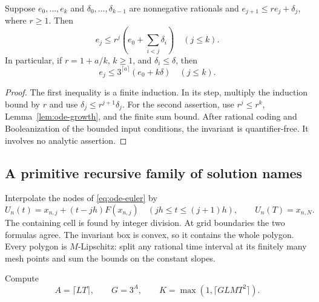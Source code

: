 \begin{lemma}
\label{lem:ode-gronwall}
Suppose $e_0,\ldots,e_k$ and $\delta_0,\ldots,\delta_{k-1}$ are
nonnegative rationals and
$e_{j+1}\le r e_j+\delta_j$, where $r\ge1$.  Then
\[
 e_j\le r^j\left(e_0+\sum_{i<j}\delta_i\right)\quad(j\le k).
\]
In particular, if $r=1+a/k$, $k\ge1$, and $\delta_i\le\delta$, then
\begin{equation}
 e_j\le3^{\lceil a\rceil}(e_0+k\delta)\quad(j\le k).
 \label{eq:ode-gronwall}
\end{equation}
\end{lemma}
\begin{proof}
The first inequality is a finite induction.  In its step, multiply the
induction bound by $r$ and use
$\delta_j\le r^{j+1}\delta_j$.  For the second assertion, use
$r^j\le r^k$, Lemma~\ref{lem:ode-growth}, and the finite sum bound.
After rational coding and Booleanization of the bounded input conditions,
the invariant is quantifier-free.  It involves no analytic assertion.
\end{proof}

\subsection{A primitive recursive family of solution names}

Interpolate the nodes of \eqref{eq:ode-euler} by
\begin{equation}
 U_n(t)=x_{n,j}+(t-jh)F(x_{n,j})
 \quad(jh\le t\le(j+1)h),\qquad U_n(T)=x_{n,N}.
 \label{eq:ode-polygon}
\end{equation}
The containing cell is found by integer division.  At grid boundaries
the two formulas agree.  The invariant box is convex, so it contains the
whole polygon.  Every polygon is $M$-Lipschitz: split any rational time
interval at its finitely many mesh points and sum the bounds on the
constant slopes.

Compute
\begin{equation}
 A=\lceil LT\rceil,\qquad G=3^A,
 \qquad K=\max(1,\lceil GLMT^2\rceil).
 \label{eq:ode-constants}
\end{equation}

